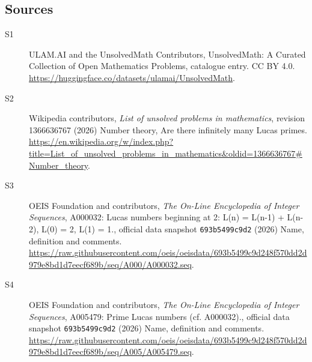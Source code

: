 \documentclass[11pt]{article}
\begin{document}
\subsection{Sources}
\begin{description}
\item[\hypertarget{source:statement:1}{S1}] ULAM.AI and the UnsolvedMath Contributors, UnsolvedMath: A Curated Collection of Open Mathematics Problems, catalogue entry. CC BY 4.0. \url{https://huggingface.co/datasets/ulamai/UnsolvedMath}.
\item[\hypertarget{source:statement:2}{S2}] Wikipedia contributors, \emph{List of unsolved problems in mathematics}, revision 1366636767 (2026) Number theory, Are there infinitely many Lucas primes. \url{https://en.wikipedia.org/w/index.php?title=List_of_unsolved_problems_in_mathematics&oldid=1366636767#Number_theory}.
\item[\hypertarget{source:statement:3}{S3}] OEIS Foundation and contributors, \emph{The On-Line Encyclopedia of Integer Sequences}, A000032: Lucas numbers beginning at 2: L(n) = L(n-1) + L(n-2), L(0) = 2, L(1) = 1., official data snapshot \texttt{693b5499c9d2} (2026) Name, definition and comments. \url{https://raw.githubusercontent.com/oeis/oeisdata/693b5499c9d248f570dd2d979e8bd1d7eecf689b/seq/A000/A000032.seq}.
\item[\hypertarget{source:statement:4}{S4}] OEIS Foundation and contributors, \emph{The On-Line Encyclopedia of Integer Sequences}, A005479: Prime Lucas numbers (cf. A000032)., official data snapshot \texttt{693b5499c9d2} (2026) Name, definition and comments. \url{https://raw.githubusercontent.com/oeis/oeisdata/693b5499c9d248f570dd2d979e8bd1d7eecf689b/seq/A005/A005479.seq}.
\end{description}
\label{end:statement}
\end{document}

